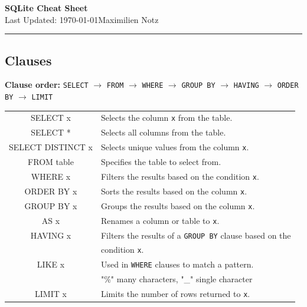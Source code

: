 \documentclass[5pt]{article}
\begin{document}
\begin{center}
    \Large{\textbf{SQLite Cheat Sheet}}\\
    \small{Last Updated: \today}\hfill\small{\textcopyright Maximilien Notz \the\year{}}
    \hspace*{-\dimexpr\oddsidemargin+1in\relax}\rule{\paperwidth}{0.4pt}
\end{center}

\begin{multicols}{2}
\setcounter{secnumdepth}{0}

\subsection{Clauses}
\textbf{Clause order:} \texttt{SELECT} $\rightarrow$ \texttt{FROM} $\rightarrow$ \texttt{WHERE} $\rightarrow$ \texttt{GROUP BY} $\rightarrow$ \texttt{HAVING} $\rightarrow$ \texttt{ORDER BY} $\rightarrow$ \texttt{LIMIT}\\
\begin{tabular}{C L}
    SELECT x          & Selects the column \texttt{x} from the table.\\
    SELECT *          & Selects all columns from the table.\\
    SELECT DISTINCT x & Selects unique values from the column \texttt{x}.\\
    FROM table        & Specifies the table to select from.\\
    WHERE x           & Filters the results based on the condition \texttt{x}.\\
    ORDER BY x        & Sorts the results based on the column \texttt{x}.\\
    GROUP BY x        & Groups the results based on the column \texttt{x}.\\
    AS x              & Renames a column or table to \texttt{x}.\\
    HAVING x          & Filters the results of a \texttt{GROUP BY} clause based on the\\
                      & condition \texttt{x}.\\
    LIKE x            & Used in \texttt{WHERE} clauses to match a pattern.\\
                      & "\%" many characters, "\_" single character\\
    LIMIT x           & Limits the number of rows returned to \texttt{x}.\\
\end{tabular}


\end{multicols}
\end{document}
